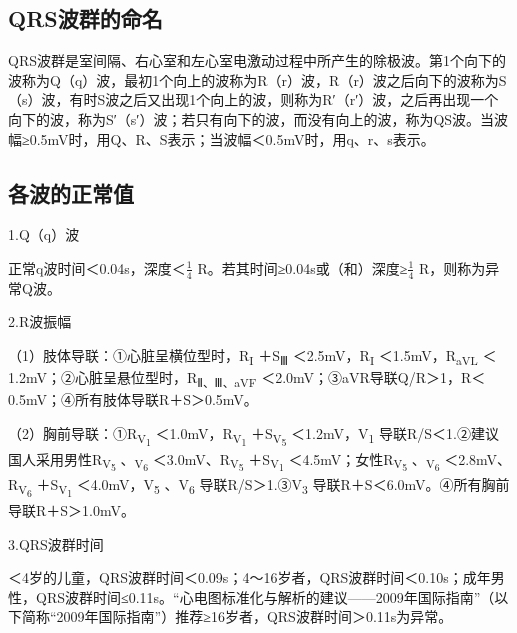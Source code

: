 \protect\hypertarget{text00009.htmlux5cux23subid36}{}{}

\subsection{QRS波群的命名}

QRS波群是室间隔、右心室和左心室电激动过程中所产生的除极波。第1个向下的波称为Q（q）波，最初1个向上的波称为R（r）波，R（r）波之后向下的波称为S（s）波，有时S波之后又出现1个向上的波，则称为R′（r′）波，之后再出现一个向下的波，称为S′（s′）波；若只有向下的波，而没有向上的波，称为QS波。当波幅≥0.5mV时，用Q、R、S表示；当波幅＜0.5mV时，用q、r、s表示。

\protect\hypertarget{text00009.htmlux5cux23subid37}{}{}

\subsection{各波的正常值}

1.Q（q）波

正常q波时间＜0.04s，深度＜$\frac{1}{4}$
R。若其时间≥0.04s或（和）深度≥$\frac{1}{4}$
R，则称为异常Q波。

2.R波振幅

（1）肢体导联：①心脏呈横位型时，R\textsubscript{I} ＋S\textsubscript{Ⅲ}
＜2.5mV，R\textsubscript{I} ＜1.5mV，R\textsubscript{aVL}
＜1.2mV；②心脏呈悬位型时，R\textsubscript{Ⅱ、Ⅲ、aVF}
＜2.0mV；③aVR导联Q/R＞1，R＜0.5mV；④所有肢体导联R＋S＞0.5mV。

（2）胸前导联：①R\textsubscript{V\textsubscript{1}}
＜1.0mV，R\textsubscript{V\textsubscript{1}}
＋S\textsubscript{V\textsubscript{5}} ＜1.2mV，V\textsubscript{1}
导联R/S＜1.②建议国人采用男性R\textsubscript{V\textsubscript{5}}
、\textsubscript{V\textsubscript{6}}
＜3.0mV、R\textsubscript{V\textsubscript{5}}
＋S\textsubscript{V\textsubscript{1}}
＜4.5mV；女性R\textsubscript{V\textsubscript{5}}
、\textsubscript{V\textsubscript{6}}
＜2.8mV、R\textsubscript{V\textsubscript{6}}
＋S\textsubscript{V\textsubscript{1}} ＜4.0mV，V\textsubscript{5}
、V\textsubscript{6} 导联R/S＞1.③V\textsubscript{3}
导联R＋S＜6.0mV。④所有胸前导联R＋S＞1.0mV。

3.QRS波群时间

＜4岁的儿童，QRS波群时间＜0.09s；4～16岁者，QRS波群时间＜0.10s；成年男性，QRS波群时间≤0.11s。“心电图标准化与解析的建议------2009年国际指南”（以下简称“2009年国际指南”）推荐≥16岁者，QRS波群时间＞0.11s为异常。

\protect\hypertarget{text00009.htmlux5cux23subid38}{}{}

